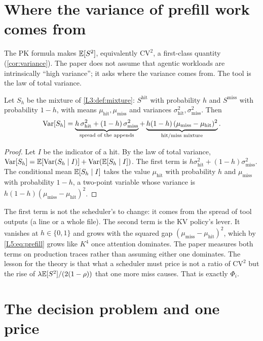 \section{Where the variance of prefill work comes from}\label{L5:sec:variance}

The PK formula makes $\mathbb{E}[S^2]$, equivalently $\mathrm{CV}^2$, a first-class
quantity (\cref{cor:variance}). The paper does not assume that agentic
workloads are intrinsically ``high variance''; it asks where the variance
comes from. The tool is the law of total variance.

\begin{lemma}\label{L5:lem:split}
Let $S_h$ be the mixture of \cref{L3:def:mixture}: $S^{\mathrm{hit}}$ with
probability $h$ and $S^{\mathrm{miss}}$ with probability $1-h$, with means
$\mu_{\mathrm{hit}},\mu_{\mathrm{miss}}$ and variances
$\sigma^2_{\mathrm{hit}},\sigma^2_{\mathrm{miss}}$. Then
\[
  \operatorname{Var}[S_h]=\underbrace{h\,\sigma^2_{\mathrm{hit}}+(1-h)\,\sigma^2_{\mathrm{miss}}}_{\text{spread of the appends}}
  +\underbrace{h(1-h)\,(\mu_{\mathrm{miss}}-\mu_{\mathrm{hit}})^2}_{\text{hit/miss mixture}} .
\]
\end{lemma}

\begin{proof}
Let $I$ be the indicator of a hit. By the law of total variance,
$\operatorname{Var}[S_h]=\mathbb{E}[\operatorname{Var}(S_h\mid I)]+\operatorname{Var}(\mathbb{E}[S_h\mid I])$. The first term is
$h\sigma^2_{\mathrm{hit}}+(1-h)\sigma^2_{\mathrm{miss}}$. The conditional
mean $\mathbb{E}[S_h\mid I]$ takes the value $\mu_{\mathrm{hit}}$ with probability
$h$ and $\mu_{\mathrm{miss}}$ with probability $1-h$, a two-point
variable whose variance is $h(1-h)(\mu_{\mathrm{miss}}-\mu_{\mathrm{hit}})^2$.
\end{proof}

The first term is not the scheduler's to change: it comes from the spread
of tool outputs (a line or a whole file). The second term is the KV
policy's lever. It vanishes at $h\in\{0,1\}$ and grows with the squared gap
$(\mu_{\mathrm{miss}}-\mu_{\mathrm{hit}})^2$, which by \eqref{L5:eq:prefill}
grows like $K^4$ once attention dominates. The paper measures both terms
on production traces rather than assuming either one dominates. The lesson
for the theory is that what a scheduler must price is not a ratio of
$\mathrm{CV}^2$ but the rise of $\lambda\mathbb{E}[S^2]/(2(1-\rho))$ that one
more miss causes. That is exactly $\Phi_i$.

\section{The decision problem and one price}\label{L5:sec:decision}

